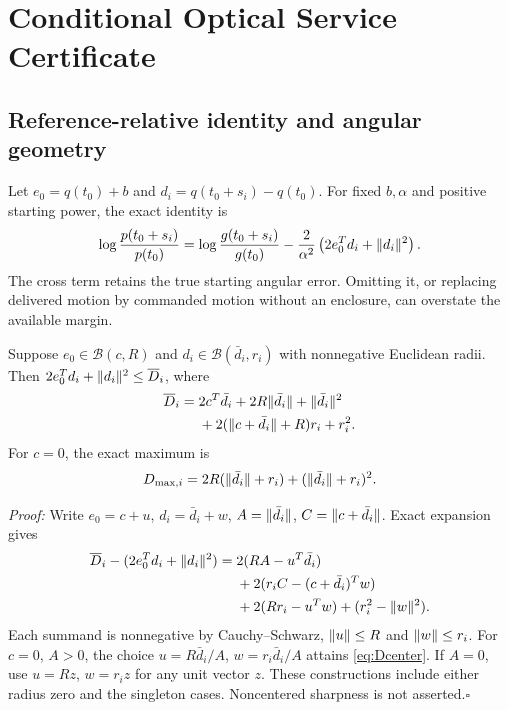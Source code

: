\section{Conditional Optical Service Certificate}
\subsection{Reference-relative identity and angular geometry}
Let $e_0=q(t_0)+b$ and $d_i=q(t_0+s_i)-q(t_0)$. For fixed $b,\alpha$ and positive starting power, the exact identity is
\begin{equation}
\log\frac{p(t_0+s_i)}{p(t_0)}=
\log\frac{g(t_0+s_i)}{g(t_0)}-
\frac{2}{\alpha^2}\left(2e_0^Td_i+\lVert d_i\rVert^2\right).
\label{eq:identity}
\end{equation}
The cross term retains the true starting angular error. Omitting it, or replacing delivered motion by commanded motion without an enclosure, can overstate the available margin.

\begin{proposition}
Suppose $e_0\in\mathcal B(c,R)$ and $d_i\in\mathcal B(\bar d_i,r_i)$ with nonnegative Euclidean radii. Then $2e_0^Td_i+\lVert d_i\rVert^2\leq\overline D_i$, where
\begin{align}
\overline D_i={}&2c^T\bar d_i+2R\lVert\bar d_i\rVert+\lVert\bar d_i\rVert^2\nonumber\\
&+2(\lVert c+\bar d_i\rVert+R)r_i+r_i^2.
\label{eq:Dgeneral}
\end{align}
For $c=0$, the exact maximum is
\begin{equation}
D_{\max,i}=2R(\lVert\bar d_i\rVert+r_i)+(\lVert\bar d_i\rVert+r_i)^2.
\label{eq:Dcenter}
\end{equation}
\end{proposition}
\emph{Proof:} Write $e_0=c+u$, $d_i=\bar d_i+w$, $A=\lVert\bar d_i\rVert$, $C=\lVert c+\bar d_i\rVert$. Exact expansion gives
\begin{align}
\overline D_i-(2e_0^Td_i+\lVert d_i\rVert^2)
={}&2(RA-u^T\bar d_i)\nonumber\\
&+2(r_iC-(c+\bar d_i)^Tw)\nonumber\\
&+2(Rr_i-u^Tw)+(r_i^2-\lVert w\rVert^2).
\end{align}
Each summand is nonnegative by Cauchy--Schwarz, $\lVert u\rVert\leq R$ and $\lVert w\rVert\leq r_i$. For $c=0$, $A>0$, the choice $u=R\bar d_i/A$, $w=r_i\bar d_i/A$ attains \eqref{eq:Dcenter}. If $A=0$, use $u=Rz$, $w=r_i z$ for any unit vector $z$. These constructions include either radius zero and the singleton cases. Noncentered sharpness is not asserted.\hfill$\square$

